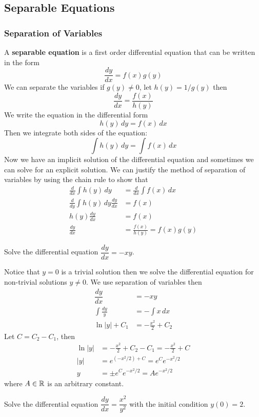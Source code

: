 \subsection{Separable Equations}
\subsubsection{Separation of Variables}
A \textbf{separable equation} is a first order differential equation that can
be written in the form
\[\frac{dy}{dx}=f(x)g(y)\]
We can separate the variables if \(g(y)\neq0\), let \(h(y)=1/g(y)\) then
\[\frac{dy}{dx}=\frac{f(x)}{h(y)}\]
We write the equation in the differential form
\[h(y)\,dy=f(x)\,dx\]
Then we integrate both sides of the equation:
\[\int h(y)\,dy=\int f(x)\,dx\]
Now we have an implicit solution of the differential equation and sometimes we
can solve for an explicit solution.
We can justify the method of separation of variables by using the chain rule
to show that
\begin{align*}
    \frac{d}{dx}\int h(y)\,dy &= \frac{d}{dx}\int f(x)\,dx \\
    \frac{d}{dy}\int h(y)\,dy\frac{dy}{dx} &= f(x) \\
    h(y)\frac{dy}{dx} &= f(x) \\
    \frac{dy}{dx} &= \frac{f(x)}{h(y)}=f(x)g(y)
\end{align*}
\begin{problem}
    Solve the differential equation \(\dfrac{dy}{dx}=-xy\).
\end{problem}
\begin{solution}
    Notice that \(y=0\) is a trivial solution then we solve the differential
    equation for non-trivial solutions \(y\neq 0\).
    We use separation of variables then
    \begin{align*}
        \dfrac{dy}{dx} &= -xy \\
        \int\frac{dy}{y} &= -\int x\,dx \\
        \ln |y|+C_1 &= -\frac{x^2}{2}+C_2
    \end{align*}
    Let \(C=C_2-C_1\), then
    \begin{align*}
        \ln |y| &= -\frac{x^2}{2}+C_2-C_1=-\frac{x^2}{2}+C \\
        |y| &= e^{(-x^2/2)+C}=e^Ce^{-x^2/2} \\
        y &= \pm e^Ce^{-x^2/2}=Ae^{-x^2/2}
    \end{align*}
    where \(A\in\mathbb{R}\) is an arbitrary constant.
\end{solution}
\begin{problem}
    Solve the differential equation \(\dfrac{dy}{dx}=\dfrac{x^2}{y^2}\) with
    the initial condition \(y(0)=2\).
\end{problem}

